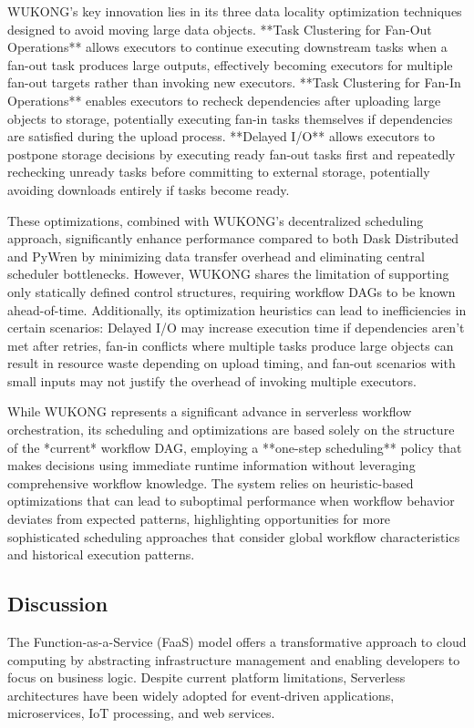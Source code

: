 \documentclass[conference]{IEEEtran}
\begin{document}
WUKONG's key innovation lies in its three data locality optimization techniques designed to avoid moving large data objects. **Task Clustering for Fan-Out Operations** allows executors to continue executing downstream tasks when a fan-out task produces large outputs, effectively becoming executors for multiple fan-out targets rather than invoking new executors. **Task Clustering for Fan-In Operations** enables executors to recheck dependencies after uploading large objects to storage, potentially executing fan-in tasks themselves if dependencies are satisfied during the upload process. **Delayed I/O** allows executors to postpone storage decisions by executing ready fan-out tasks first and repeatedly rechecking unready tasks before committing to external storage, potentially avoiding downloads entirely if tasks become ready.

These optimizations, combined with WUKONG's decentralized scheduling approach, significantly enhance performance compared to both Dask Distributed and PyWren by minimizing data transfer overhead and eliminating central scheduler bottlenecks. However, WUKONG shares the limitation of supporting only statically defined control structures, requiring workflow DAGs to be known ahead-of-time. Additionally, its optimization heuristics can lead to inefficiencies in certain scenarios: Delayed I/O may increase execution time if dependencies aren't met after retries, fan-in conflicts where multiple tasks produce large objects can result in resource waste depending on upload timing, and fan-out scenarios with small inputs may not justify the overhead of invoking multiple executors.

While WUKONG represents a significant advance in serverless workflow orchestration, its scheduling and optimizations are based solely on the structure of the *current* workflow DAG, employing a **one-step scheduling** policy that makes decisions using immediate runtime information without leveraging comprehensive workflow knowledge. The system relies on heuristic-based optimizations that can lead to suboptimal performance when workflow behavior deviates from expected patterns, highlighting opportunities for more sophisticated scheduling approaches that consider global workflow characteristics and historical execution patterns.

\subsection{Discussion}
The Function-as-a-Service (FaaS) model offers a transformative approach to cloud computing by abstracting infrastructure management and enabling developers to focus on business logic. Despite current platform limitations, Serverless architectures have been widely adopted for event-driven applications, microservices, IoT processing, and web services.
\end{document}
